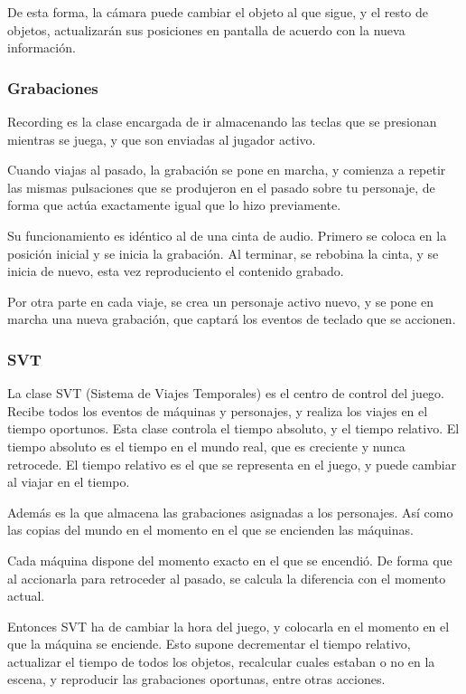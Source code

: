\documentclass[11pt,a4paper]{article}
\begin{document}
De esta forma, la cámara puede cambiar el objeto al que sigue, y el resto de 
objetos, actualizarán sus posiciones en pantalla de acuerdo con la nueva 
información.

\subsubsection{Grabaciones}

Recording es la clase encargada de ir almacenando las teclas que se presionan 
mientras se juega, y que son enviadas al jugador activo.

Cuando viajas al pasado, la grabación se pone en marcha, y comienza a repetir 
las mismas pulsaciones que se produjeron en el pasado sobre tu personaje, de 
forma que actúa exactamente igual que lo hizo previamente.

Su funcionamiento es idéntico al de una cinta de audio. Primero se coloca en la 
posición inicial y se inicia la grabación. Al terminar, se rebobina la cinta, y 
se inicia de nuevo, esta vez reproduciento el contenido grabado.

Por otra parte en cada viaje, se crea un personaje activo nuevo, y se pone en 
marcha una nueva grabación, que captará los eventos de teclado que se accionen.

\subsubsection{SVT}

La clase SVT (Sistema de Viajes Temporales) es el centro de control del juego.  
Recibe todos los eventos de máquinas y personajes, y realiza los viajes en el 
tiempo oportunos. Esta clase controla el tiempo absoluto, y el tiempo relativo.
El tiempo absoluto es el tiempo en el mundo real, que es creciente y nunca 
retrocede. El tiempo relativo es el que se representa en el juego, y puede 
cambiar al viajar en el tiempo.

Además es la que almacena las grabaciones asignadas a los personajes. Así como 
las copias del mundo en el momento en el que se encienden las máquinas.

Cada máquina dispone del momento exacto en el que se encendió. De forma que al 
accionarla para retroceder al pasado, se calcula la diferencia con el momento 
actual.

Entonces SVT ha de cambiar la hora del juego, y colocarla en el momento en el 
que la máquina se enciende. Esto supone decrementar el tiempo relativo, 
actualizar el tiempo de todos los objetos, recalcular cuales estaban o no en la 
escena, y reproducir las grabaciones oportunas, entre otras acciones.
\end{document}
